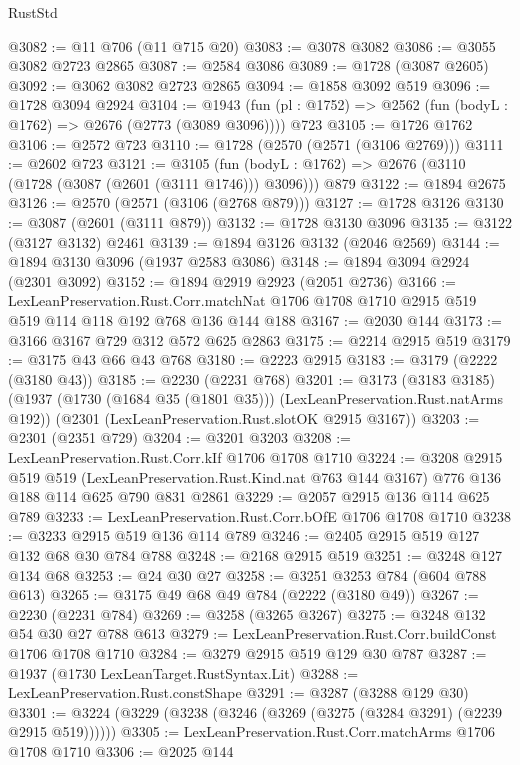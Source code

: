 \begin{lexlean}{RustStd}
\begin{coremodule}
{\begin{coremodule}
{{{{{{{{{{{{{@3082 := @11 @706 (@11 @715 @20)
@3083 := @3078 @3082
@3086 := @3055 @3082 @2723 @2865
@3087 := @2584 @3086
@3089 := @1728 (@3087 @2605)
@3092 := @3062 @3082 @2723 @2865
@3094 := @1858 @3092 @519
@3096 := @1728 @3094 @2924
@3104 := @1943 (fun (pl : @1752) => @2562 (fun (bodyL : @1762) => @2676 (@2773 (@3089 @3096)))) @723
@3105 := @1726 @1762
@3106 := @2572 @723
@3110 := @1728 (@2570 (@2571 (@3106 @2769)))
@3111 := @2602 @723
@3121 := @3105
    (fun (bodyL : @1762) => @2676 (@3110 (@1728 (@3087 (@2601 (@3111 @1746))) @3096)))
    @879
@3122 := @1894 @2675
@3126 := @2570 (@2571 (@3106 (@2768 @879)))
@3127 := @1728 @3126
@3130 := @3087 (@2601 (@3111 @879))
@3132 := @1728 @3130 @3096
@3135 := @3122 (@3127 @3132) @2461
@3139 := @1894 @3126 @3132 (@2046 @2569)
@3144 := @1894 @3130 @3096 (@1937 @2583 @3086)
@3148 := @1894 @3094 @2924 (@2301 @3092)
@3152 := @1894 @2919 @2923 (@2051 @2736)
@3166 := LexLeanPreservation.Rust.Corr.matchNat
    @1706
    @1708
    @1710
    @2915
    @519
    @519
    @114
    @118
    @192
    @768
    @136
    @144
    @188
@3167 := @2030 @144
@3173 := @3166 @3167 @729 @312 @572 @625 @2863
@3175 := @2214 @2915 @519
@3179 := @3175 @43 @66 @43 @768
@3180 := @2223 @2915
@3183 := @3179 (@2222 (@3180 @43))
@3185 := @2230 (@2231 @768)
@3201 := @3173
    (@3183 @3185)
    (@1937 (@1730 (@1684 @35 (@1801 @35))) (LexLeanPreservation.Rust.natArms @192))
    (@2301 (LexLeanPreservation.Rust.slotOK @2915 @3167))
@3203 := @2301 (@2351 @729)
@3204 := @3201 @3203
@3208 := LexLeanPreservation.Rust.Corr.kIf @1706 @1708 @1710
@3224 := @3208
    @2915
    @519
    @519
    (LexLeanPreservation.Rust.Kind.nat @763 @144 @3167)
    @776
    @136
    @188
    @114
    @625
    @790
    @831
    @2861
@3229 := @2057 @2915 @136 @114 @625 @789
@3233 := LexLeanPreservation.Rust.Corr.bOfE @1706 @1708 @1710
@3238 := @3233 @2915 @519 @136 @114 @789
@3246 := @2405 @2915 @519 @127 @132 @68 @30 @784 @788
@3248 := @2168 @2915 @519
@3251 := @3248 @127 @134 @68
@3253 := @24 @30 @27
@3258 := @3251 @3253 @784 (@604 @788 @613)
@3265 := @3175 @49 @68 @49 @784 (@2222 (@3180 @49))
@3267 := @2230 (@2231 @784)
@3269 := @3258 (@3265 @3267)
@3275 := @3248 @132 @54 @30 @27 @788 @613
@3279 := LexLeanPreservation.Rust.Corr.buildConst @1706 @1708 @1710
@3284 := @3279 @2915 @519 @129 @30 @787
@3287 := @1937 (@1730 LexLeanTarget.RustSyntax.Lit)
@3288 := LexLeanPreservation.Rust.constShape
@3291 := @3287 (@3288 @129 @30)
@3301 := @3224 (@3229 (@3238 (@3246 (@3269 (@3275 (@3284 @3291) (@2239 @2915 @519))))))
@3305 := LexLeanPreservation.Rust.Corr.matchArms @1706 @1708 @1710
@3306 := @2025 @144
}}}}}}}}}}}}}
\end{coremodule}}
\end{coremodule}
\end{lexlean}

